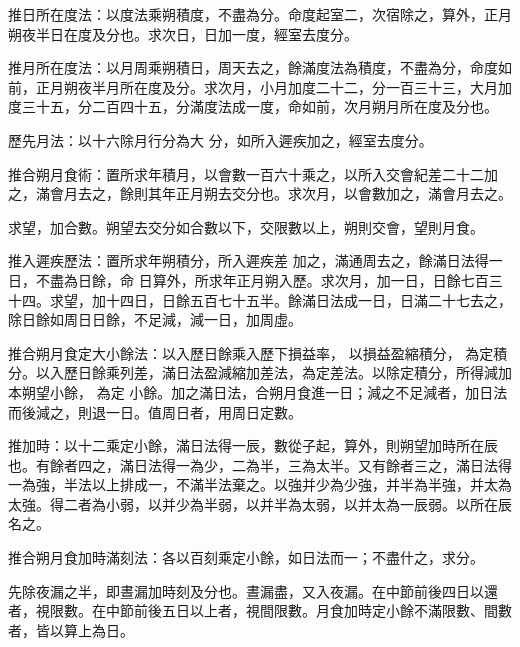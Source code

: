 \begin{pinyinscope}
 推日所在度法：以度法乘朔積度，不盡為分。命度起室二，次宿除之，算外，正月朔夜半日在度及分也。求次日，日加一度，經室去度分。



 推月所在度法：以月周乘朔積日，周天去之，餘滿度法為積度，不盡為分，命度如前，正月朔夜半月所在度及分。求次月，小月加度二十二，分一百三十三，大月加度三十五，分二百四十五，分滿度法成一度，命如前，次月朔月所在度及分也。



 歷先月法：以十六除月行分為大
 分，如所入遲疾加之，經室去度分。



 推合朔月食術：置所求年積月，以會數一百六十乘之，以所入交會紀差二十二加之，滿會月去之，餘則其年正月朔去交分也。求次月，以會數加之，滿會月去之。



 求望，加合數。朔望去交分如合數以下，交限數以上，朔則交會，望則月食。


推入遲疾歷法：置所求年朔積分，所入遲疾差
 加之，滿通周去之，餘滿日法得一日，不盡為日餘，命
 日算外，所求年正月朔入歷。求次月，加一日，日餘七百三十四。求望，加十四日，日餘五百七十五半。餘滿日法成一日，日滿二十七去之，除日餘如周日日餘，不足減，減一日，加周虛。


推合朔月食定大小餘法：以入歷日餘乘入歷下損益率，
 以損益盈縮積分，
 為定積分。以入歷日餘乘列差，滿日法盈減縮加差法，為定差法。以除定積分，所得減加本朔望小餘，
 為定
 小餘。加之滿日法，合朔月食進一日；減之不足減者，加日法而後減之，則退一日。值周日者，用周日定數。



 推加時：以十二乘定小餘，滿日法得一辰，數從子起，算外，則朔望加時所在辰也。有餘者四之，滿日法得一為少，二為半，三為太半。又有餘者三之，滿日法得一為強，半法以上排成一，不滿半法棄之。以強并少為少強，并半為半強，并太為太強。得二者為小弱，以并少為半弱，以并半為太弱，以并太為一辰弱。以所在辰名之。



 推合朔月食加時滿刻法：各以百刻乘定小餘，如日法而一；不盡什之，求分。



 先除夜漏之半，即晝漏加時刻及分也。晝漏盡，又入夜漏。在中節前後四日以還者，視限數。在中節前後五日以上者，視間限數。月食加時定小餘不滿限數、間數者，皆以算上為日。




\end{pinyinscope}

